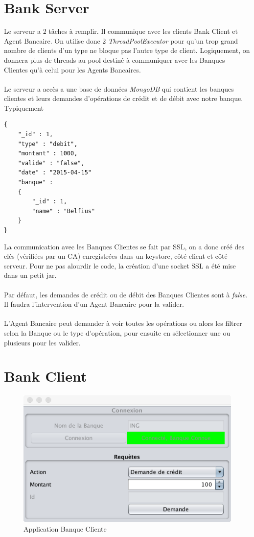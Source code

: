 \documentclass[11pt,fleqn]{article}
\begin{document}
\section{Bank Server}
Le serveur a 2 tâches à remplir. Il communique avec les clients Bank Client et Agent Bancaire. On utilise donc 2 \emph{ThreadPoolExecutor} pour qu'un trop grand nombre de clients d'un type ne bloque pas l'autre type de client. Logiquement, on donnera plus de threads au pool destiné à communiquer avec les Banques Clientes qu'à celui pour les Agents Bancaires.\\\\
Le serveur a accès a une base de données \emph{MongoDB} qui contient les banques clientes et leurs demandes d'opérations de crédit et de débit avec notre banque. Typiquement
\begin{lstlisting}
{
	"_id" : 1,
	"type" : "debit",
	"montant" : 1000,
	"valide" : "false",
	"date" : "2015-04-15"
	"banque" : 
	{
		"_id" : 1,
		"name" : "Belfius"
	}
}
\end{lstlisting}
La communication avec les Banques Clientes se fait par SSL, on a donc créé des clés (vérifiées par un CA) enregistrées dans un keystore, côté client et côté serveur. Pour ne pas alourdir le code, la création d'une socket SSL a été mise dans un petit jar.\\\\
Par défaut, les demandes de crédit ou de débit des Banques Clientes sont à \emph{false}. Il faudra l'intervention d'un Agent Bancaire pour la valider.\\\\
L'Agent Bancaire peut demander à voir toutes les opérations ou alors les filtrer selon la Banque ou le type d'opération, pour ensuite en sélectionner une ou plusieurs pour les valider.
\section{Bank Client}
\begin{figure}[H]
	\includegraphics[scale=0.5]{Images/BankClient}
	\centering
	\caption{Application Banque Cliente}
\end{figure}
\end{document}
